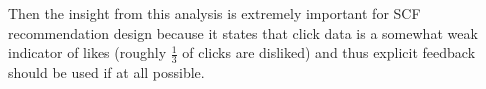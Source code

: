 Then the insight from this analysis is extremely important 
for SCF recommendation design because it states that click data is a somewhat 
weak indicator of likes (roughly $\frac{1}{3}$ of clicks are disliked)
and thus explicit feedback should be used if at all possible.

\begin{figure}[t!]
\centering
{}
\hspace{-4.2mm}

\end{figure}
